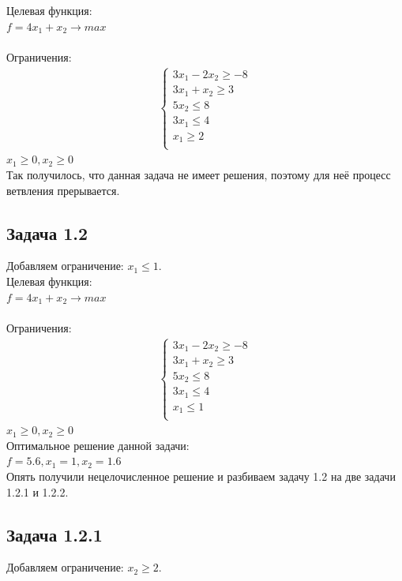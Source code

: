 \documentclass[14pt,a4paper,fleqn]{extarticle}
\begin{document}
	Целевая функция:\\
	$f = 4x_1+x_2 \longrightarrow max$\\\\
	Ограничения:
	\begin{align*}
		\begin{cases}
			3x_1 - 2x_2 \geq -8\\
			3x_1 + x_2 \geq 3\\
			5 x_2 \leq 8\\
			3 x_1 \leq 4\\
			x_1 \geq 2\\
		\end{cases}
	\end{align*}
	$x_1 \geq 0, x_2 \geq 0$\\
	
	Так получилось, что данная задача не имеет решения, поэтому для неё процесс ветвления прерывается.
	\newpage
	\subsection*{Задача 1.2}
	Добавляем ограничение: $x_1 \leq 1$.\\
	
	Целевая функция:\\
	$f = 4x_1+x_2 \longrightarrow max$\\\\
	Ограничения:
	\begin{align*}
		\begin{cases}
			3x_1 - 2x_2 \geq -8\\
			3x_1 + x_2 \geq 3\\
			5 x_2 \leq 8\\
			3 x_1 \leq 4\\
			x_1 \leq 1\\
		\end{cases}
	\end{align*}
	$x_1 \geq 0, x_2 \geq 0$\\
	
	Оптимальное решение данной задачи:\\
	$f = 5.6, x_1 = 1, x_2 = 1.6$\\
	
	Опять получили нецелочисленное решение и разбиваем задачу 1.2 на две задачи 1.2.1 и 1.2.2.
	\newpage
	\subsection*{Задача 1.2.1}
	Добавляем ограничение: $x_2 \geq 2$.\\
	
\end{document}
